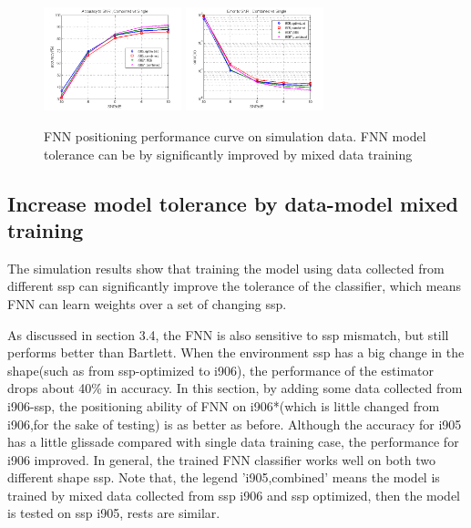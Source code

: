 \begin{figure}
\includegraphics[width=4cm,height=3cm]{figure/Accuracy_to_SNR_Combined_vs_Single}
\includegraphics[width=4cm,height=3cm]{figure/Error_to_SNR_Combined_vs_Single}
\caption{FNN positioning performance curve on simulation data. FNN model tolerance can be by significantly improved by mixed data training}
\end{figure}

\subsection{%
Increase model tolerance by data-model mixed training}
The simulation results show that training the model using data collected from different ssp can significantly improve the tolerance of the classifier, which means FNN can learn weights over a set of changing ssp.


As discussed in section 3.4, the FNN is also sensitive to ssp mismatch, but still performs better than Bartlett. When the environment ssp has a big change in the shape(such as from ssp-optimized to i906), the performance of the estimator drops about 40\% in accuracy. In this section, by adding some data collected from i906-ssp, the positioning ability of FNN on i906{*}(which is little changed from i906,for the sake of testing) is as better as before. Although the accuracy for i905 has a little glissade compared with single data training case, the performance for i906 improved. In general, the trained FNN classifier works well on both two different shape ssp. Note that, the legend 'i905,combined' means the model is trained by mixed data collected from ssp i906 and ssp optimized, then the model is tested on ssp i905, rests are similar.

